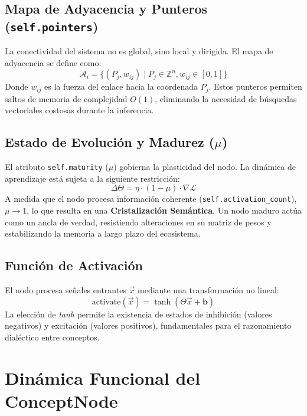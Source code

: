 \documentclass[12pt]{article}
\begin{document}
\subsection{Mapa de Adyacencia y Punteros (\texttt{self.pointers})}
La conectividad del sistema no es global, sino local y dirigida. El mapa de adyacencia se define como:
\begin{equation}
    \mathcal{A}_i = \{ (P_j, w_{ij}) \mid P_j \in \mathbb{Z}^n, w_{ij} \in [0, 1] \}
\end{equation}
Donde $w_{ij}$ es la fuerza del enlace hacia la coordenada $P_j$. Estos punteros permiten saltos de memoria de complejidad $O(1)$, eliminando la necesidad de búsquedas vectoriales costosas durante la inferencia.



\subsection{Estado de Evolución y Madurez ($\mu$)}
El atributo \texttt{self.maturity} ($\mu$) gobierna la plasticidad del nodo. La dinámica de aprendizaje está sujeta a la siguiente restricción:
\begin{equation}
    \Delta \Theta = \eta \cdot (1 - \mu) \cdot \nabla \mathcal{L}
\end{equation}
A medida que el nodo procesa información coherente (\texttt{self.activation\_count}), $\mu \to 1$, lo que resulta en una \textbf{Cristalización Semántica}. Un nodo maduro actúa como un ancla de verdad, resistiendo alteraciones en su matriz de pesos y estabilizando la memoria a largo plazo del ecosistema.

\subsection{Función de Activación}
El nodo procesa señales entrantes $\vec{x}$ mediante una transformación no lineal:
\begin{equation}
    \text{activate}(\vec{x}) = \tanh(\Theta \vec{x} + \bm{b})
\end{equation}
La elección de \textit{tanh} permite la existencia de estados de inhibición (valores negativos) y excitación (valores positivos), fundamentales para el razonamiento dialéctico entre conceptos.




\section{Dinámica Funcional del ConceptNode}
\end{document}
